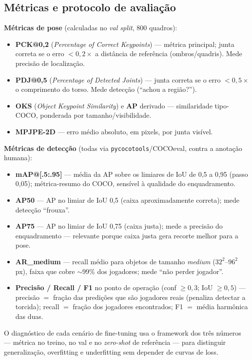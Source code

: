 \documentclass[12pt]{article}
\begin{document}
\subsection{Métricas e protocolo de avaliação}

\noindent\textbf{Métricas de pose} (calculadas no \emph{val split}, 800 quadros):
\begin{itemize}
  \item \textbf{PCK@0,2} (\emph{Percentage of Correct Keypoints}) --- métrica principal; junta correta se o erro $< 0{,}2\times$ a distância de referência (ombros/quadris). Mede precisão de localização.
  \item \textbf{PDJ@0,5} (\emph{Percentage of Detected Joints}) --- junta correta se o erro $< 0{,}5\times$ o comprimento do torso. Mede detecção (``achou a região?'').
  \item \textbf{OKS} (\emph{Object Keypoint Similarity}) e \textbf{AP} derivado --- similaridade tipo-COCO, ponderada por tamanho/visibilidade.
  \item \textbf{MPJPE-2D} --- erro médio absoluto, em pixels, por junta visível.
\end{itemize}

\noindent\textbf{Métricas de detecção} (todas via \texttt{pycocotools}/COCOeval, contra a anotação humana):
\begin{itemize}
  \item \textbf{mAP@[.5:.95]} --- média da AP sobre os limiares de IoU de 0,5 a 0,95 (passo 0,05); métrica-resumo do COCO, sensível à qualidade do enquadramento.
  \item \textbf{AP50} --- AP no limiar de IoU 0,5 (caixa aproximadamente correta); mede detecção ``frouxa''.
  \item \textbf{AP75} --- AP no limiar de IoU 0,75 (caixa justa); mede a precisão do enquadramento --- relevante porque caixa justa gera recorte melhor para a pose.
  \item \textbf{AR\_medium} --- recall médio para objetos de tamanho \emph{medium} ($32^2$--$96^2$ px), faixa que cobre $\sim$99\% dos jogadores; mede ``não perder jogador''.
  \item \textbf{Precisão / Recall / F1} no ponto de operação (conf $\geq 0{,}3$; IoU $\geq 0{,}5$) --- precisão $=$ fração das predições que são jogadores reais (penaliza detectar a torcida); recall $=$ fração dos jogadores encontrados; F1 $=$ média harmônica das duas.
\end{itemize}

O diagnóstico de cada cenário de fine-tuning usa o framework dos três números --- métrica no treino, no val e no \emph{zero-shot} de referência --- para distinguir generalização, overfitting e underfitting sem depender de curvas de loss.
\end{document}
